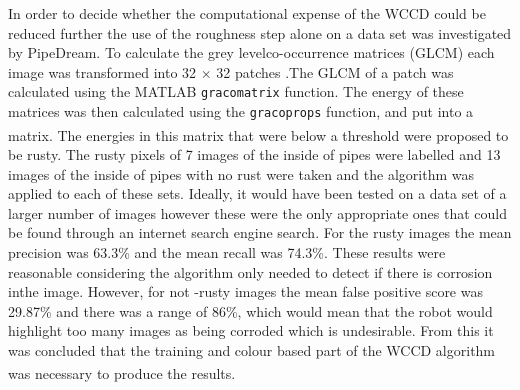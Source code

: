 \documentclass[11pt]{article}		%
\newcommand{\supercite}[1]{\textsuperscript{\cite{#1}}}		%
\begin{document}
		    In order to decide whether the computational expense of the WCCD could be reduced further the use of the roughness step alone on a data set was investigated by PipeDream. To calculate the grey levelco-occurrence matrices (GLCM) each image was transformed into 32 $\times$ 32 patches .The GLCM of a patch was calculated using the MATLAB \verb|gracomatrix| function. The energy of these matrices was then calculated using the \verb|gracoprops| function, and put into a matrix. The energies in this matrix that were below a threshold\supercite{WCCD} were proposed to be rusty. The rusty pixels of 7 images of the inside of pipes were labelled and 13 images of the inside of pipes with no rust were taken and the algorithm was applied to each of these sets. Ideally, it would have been tested on a data set of a larger number of images however these were the only appropriate ones that could be found through an internet search engine search. For the rusty images the mean precision was 63.3\% and the mean recall was 74.3\%. These results were reasonable considering the algorithm only needed to detect if there is corrosion inthe image. However, for not -rusty images the mean false positive score was 29.87\% and there was a range of 86\%, which would mean that the robot would highlight too many images as being corroded which is undesirable. From this it was concluded that the training and colour based part of the WCCD algorithm was necessary to produce the results.\supercite{WCCD} 
\end{document}
